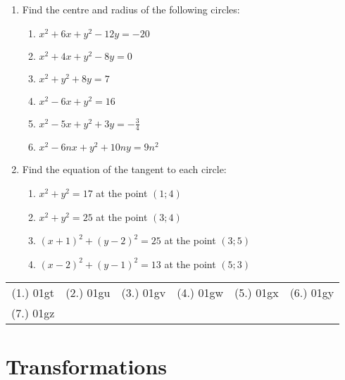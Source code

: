 {\begin{enumerate}
\item Find the centre and radius of the following circles: 
\begin{enumerate} 
\item $ x^2 + 6x + y^2 - 12y = -20 $ 
\item $ x^2 + 4x + y^2 - 8y = 0 $ 
\item $ x^2 + y^2 + 8y = 7 $ 
\item $ x^2 - 6x + y^2 = 16 $ 
\item $ x^2 - 5x + y^2 + 3y = -\frac{3}{4} $ 
\item $ x^2 - 6nx + y^2 + 10ny = 9n^2 $ 
\end{enumerate} 

\item Find the equation of the tangent to each circle: 
\begin{enumerate} 
\item $ x^2 + y^2 = 17 $ at the point $(1;4)$ 
\item $ x^2 + y^2 = 25 $ at the point $(3;4)$ 
\item $ (x+1)^2 + (y-2)^2 = 25 $ at the point $(3;5)$ 
\item $ (x-2)^2 + (y-1)^2 = 13 $ at the point $(5;3)$ 
\end{enumerate} 
\end{enumerate}

\par \practiceinfo
\par \begin{tabular}[h]{cccccc}
(1.)	01gt	&
(2.)	01gu	&
(3.)	01gv	&
(4.)	01gw	&
(5.)	01gx	&
(6.)	01gy	\\ %
(7.)	01gz	&
\end{tabular}}

\section{Transformations}


